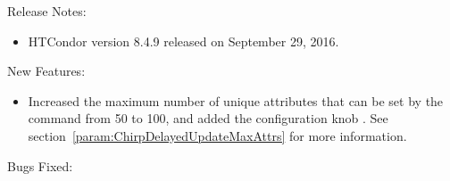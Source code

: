 \noindent Release Notes:

\begin{itemize}

\item HTCondor version 8.4.9 released on September 29, 2016.

\end{itemize}


\noindent New Features:

\begin{itemize}

\item Increased the maximum number of unique attributes that can be 
set by the  command  from
50 to 100, and added the configuration knob .
See section~\ref{param:ChirpDelayedUpdateMaxAttrs} for more information.

\end{itemize}

\noindent Bugs Fixed:

